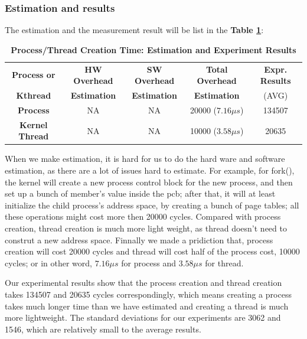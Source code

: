 \subsubsection{Estimation and results}

The estimation and the measurement result will be list in the \textbf{Table \ref{process_creation_time}}:

\begin{table}[ht]
  \centering
  \caption{\textbf{Process/Thread Creation Time: Estimation and Experiment Results}}
  \begin{threeparttable}
  \begin{tabular}{ccccc}
  \hline
      \textbf{Process or} & \textbf{HW Overhead} & \textbf{SW Overhead } & \textbf{Total Overhead} & \textbf{Expr. Results} \\
      \textbf{Kthread} & \textbf{Estimation}       &  \textbf{Estimation}         & \textbf{Estimation}  & (AVG)   \\
  \hline
      \textbf{Process} & NA & NA & 20000 ($7.16 \mu s$) & 134507 \\
      \textbf{Kernel Thread} & NA & NA & 10000 ($3.58 \mu s$) & 20635\\
  \hline
  \end{tabular}
  \end{threeparttable}
  \label{process_creation_time}
\end{table}

When we make estimation, it is hard for us to do the hard ware and software estimation, as there are a lot of issues hard to estimate. For example, for fork(), the kernel will create a new process control block for the new process, and then set
up a bunch of member's value inside the pcb; after that, it will at least initialize the child process's address space, by creating a bunch of page tables; all these operations might cost more then 20000 cycles. Compared with process creation,
thread creation is much more light weight, as thread doesn't need to construt a new address space. Finnally we made a pridiction that, process creation will cost 20000 cycles and thread will cost half of the process cost, 10000 cycles; or in other
word, $7.16 \mu s$ for process and $3.58 \mu s$ for thread.

Our experimental results show that the process creation and thread creation takes 134507 and 20635 cycles correspondingly, which means creating a process takes much longer time than we have estimated and creating a thread is much more lightweight. The standard deviations for our experiments are 3062 and 1546, which are relatively small to the average results.



